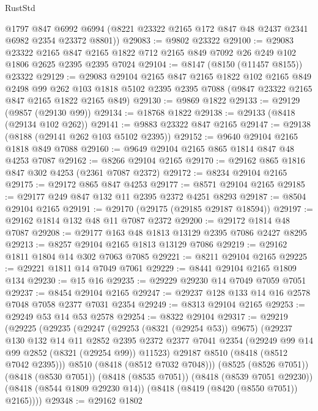 \begin{lexlean}{RustStd}
\begin{coremodule}
      @1797
      @847
      @6992
      @6994
      (@8221 @23322 @2165 @172 @847 @48 @2437 @2341 @6982 @2354 @23372 @8801))
@29083 := @9802 @23322
@29100 := @29083
    @23322
    @2165
    @847
    @2165
    @1822
    @712
    @2165
    @849
    @7092
    @26
    @249
    @102
    @1806
    @2625
    @2395
    @2395
    @7024
@29104 := @8147 (@8150 (@11457 @8155)) @23322
@29129 := @29083
    @29104
    @2165
    @847
    @2165
    @1822
    @102
    @2165
    @849
    @2498
    @99
    @262
    @103
    @1818
    @5102
    @2395
    @2395
    @7088
    (@9847 @23322 @2165 @847 @2165 @1822 @2165 @849)
@29130 := @9869 @1822
@29133 := @29129 (@9857 (@29130 @99))
@29134 := @18768 @1822
@29138 := @29133 (@8418 (@29134 @102 @262))
@29141 := @9883 @23322 @847 @2165
@29147 := @29138 (@8188 (@29141 @262 @103 @5102 @2395))
@29152 := @9640 @29104 @2165 @1818 @849 @7088
@29160 := @9649 @29104 @2165 @865 @1814 @847 @48 @4253 @7087
@29162 := @8266 @29104 @2165
@29170 := @29162 @865 @1816 @847 @302 @4253 (@2361 @7087 @2372)
@29172 := @8234 @29104 @2165
@29175 := @29172 @865 @847 @4253
@29177 := @8571 @29104 @2165
@29185 := @29177 @249 @847 @132 @11 @2395 @2372 @4251 @8293
@29187 := @8504 @29104 @2165
@29191 := @29170 (@29175 (@29185 @29187 @18594))
@29197 := @29162 @1814 @132 @48 @11 @7087 @2372
@29200 := @29172 @1814 @48 @7087
@29208 := @29177 @163 @48 @1813 @13129 @2395 @7086 @2427 @8295
@29213 := @8257 @29104 @2165 @1813 @13129 @7086
@29219 := @29162 @1811 @1804 @14 @302 @7063 @7085
@29221 := @8211 @29104 @2165
@29225 := @29221 @1811 @14 @7049 @7061
@29229 := @8441 @29104 @2165 @1809 @134
@29230 := @15 @16
@29235 := @29229 @29230 @14 @7049 @7059 @7051
@29237 := @8454 @29104 @2165
@29247 := @29237 @128 @133 @14 @16 @2578 @7048 @7058 @2377 @7031 @2354
@29249 := @8313 @29104 @2165
@29253 := @29249 @53 @14 @53 @2578
@29254 := @8322 @29104
@29317 := @29219
    (@29225
      (@29235
        (@29247
          (@29253 (@8321 (@29254 @53)) @9675)
          (@29237
            @130
            @132
            @14
            @11
            @2852
            @2395
            @2372
            @2377
            @7041
            @2354
            (@29249 @99 @14 @99 @2852 (@8321 (@29254 @99)) @11523)
            @29187
            @8510
            (@8418 (@8512 @7042 @2395)))
          @8510
          (@8418 (@8512 @7032 @7048)))
        (@8525 (@8526 @7051))
        (@8418 (@8530 @7051))
        (@8418 (@8535 @7051))
        (@8418 (@8539 @7051 @29230))
        (@8418 (@8544 @1809 @29230 @14))
        (@8418 (@8419 (@8420 (@8550 @7051)) @2165))))
@29348 := @29162
    @1802

\end{coremodule}
\end{lexlean}
